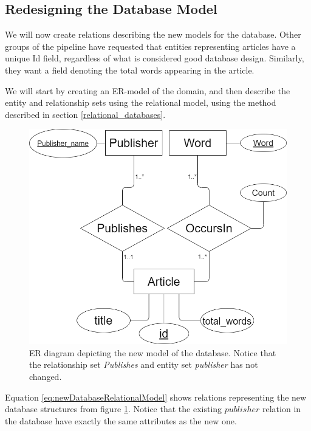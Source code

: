 \subsection{Redesigning the Database Model}\label{databaseModelRedesignNF}
We will now create relations describing the new models for the database.
Other groups of the \knox{} pipeline have requested that entities representing articles have a unique Id field, regardless of what is considered good database design.
Similarly, they want a field denoting the total words appearing in the article.

We will start by creating an ER-model of the domain, and then describe the entity and relationship sets using the relational model, using the method described in section \ref{relational_databases}.

\begin{figure}[H]
    \centering
    \includegraphics[scale=0.35]{Images/new ER.drawio.png}
    \caption{ER diagram depicting the new model of the database. Notice that the relationship set \textit{Publishes} and entity set \textit{publisher} has not changed.}
    \label{fig:newdatabaseRedesignER}
\end{figure}

Equation \ref{eq:newDatabaseRelationalModel} shows relations representing the new database structures from figure \ref{fig:newdatabaseRedesignER}.
Notice that the existing $publisher$ relation in the database have exactly the same attributes as the new one. 

